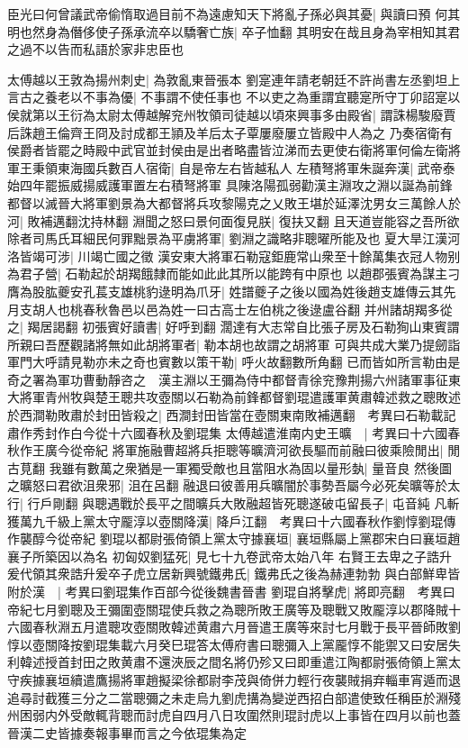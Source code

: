 臣光曰何曾議武帝偷惰取過目前不為遠慮知天下將亂子孫必與其憂|{
	與讀曰預}
何其明也然身為僭侈使子孫承流卒以驕奢亡族|{
	卒子恤翻}
其明安在哉且身為宰相知其君之過不以告而私語於家非忠臣也

太傅越以王敦為揚州刺史|{
	為敦亂東晉張本}
劉寔連年請老朝廷不許尚書左丞劉坦上言古之養老以不事為優|{
	不事謂不使任事也}
不以吏之為重謂宜聽寔所守丁卯詔寔以侯就第以王衍為太尉太傅越解兖州牧領司徒越以頃來興事多由殿省|{
	謂誅楊駿廢賈后誅趙王倫齊王冏及討成都王頴及羊后太子覃屢廢屢立皆殿中人為之}
乃奏宿衛有侯爵者皆罷之時殿中武官並封侯由是出者略盡皆泣涕而去更使右衛將軍何倫左衛將軍王秉領東海國兵數百人宿衛|{
	自是帝左右皆越私人}
左積弩將軍朱誕奔漢|{
	武帝泰始四年罷振威揚威護軍置左右積弩將軍}
具陳洛陽孤弱勸漢主淵攻之淵以誕為前鋒都督以滅晉大將軍劉景為大都督將兵攻黎陽克之乂敗王堪於延澤沈男女三萬餘人於河|{
	敗補邁翻沈持林翻}
淵聞之怒曰景何面復見朕|{
	復扶又翻}
且天道豈能容之吾所欲除者司馬氏耳細民何罪黜景為平虜將軍|{
	劉淵之識略非聰曜所能及也}
夏大旱江漢河洛皆竭可涉|{
	川竭亡國之徵}
漢安東大將軍石勒寇鉅鹿常山衆至十餘萬集衣冠人物别為君子營|{
	石勒起於胡羯餓隸而能如此此其所以能跨有中原也}
以趙郡張賓為謀主刁膺為股肱夔安孔萇支雄桃豹逯明為爪牙|{
	姓譜夔子之後以國為姓後趙支雄傳云其先月支胡人也桃春秋魯邑以邑為姓一曰古高士左伯桃之後逯盧谷翻}
并州諸胡羯多從之|{
	羯居謁翻}
初張賓好讀書|{
	好呼到翻}
濶達有大志常自比張子房及石勒狥山東賓謂所親曰吾歷觀諸將無如此胡將軍者|{
	勒本胡也故謂之胡將軍}
可與共成大業乃提劒詣軍門大呼請見勒亦未之奇也賓數以策干勒|{
	呼火故翻數所角翻}
已而皆如所言勒由是奇之署為軍功曹動靜咨之　漢主淵以王彌為侍中都督青徐兖豫荆揚六州諸軍事征東大將軍青州牧與楚王聰共攻壺關以石勒為前鋒都督劉琨遣護軍黄肅韓述救之聰敗述於西澗勒敗肅於封田皆殺之|{
	西澗封田皆當在壺關東南敗補邁翻　考異曰石勒載記肅作秀封作白今從十六國春秋及劉琨集}
太傅越遣淮南内史王曠　|{
	考異曰十六國春秋作王廣今從帝紀}
將軍施融曹超將兵拒聰等曠濟河欲長驅而前融曰彼乘險閒出|{
	閒古莧翻}
我雖有數萬之衆猶是一軍獨受敵也且當阻水為固以量形埶|{
	量音良}
然後圖之曠怒曰君欲沮衆邪|{
	沮在呂翻}
融退曰彼善用兵曠闇於事勢吾屬今必死矣曠等於太行|{
	行戶剛翻}
與聰遇戰於長平之間曠兵大敗融超皆死聰遂破屯留長子|{
	屯音純}
凡斬獲萬九千級上黨太守龎淳以壺關降漢|{
	降戶江翻　考異曰十六國春秋作劉惇劉琨傳作襲醇今從帝紀}
劉琨以都尉張倚領上黨太守據襄垣|{
	襄垣縣屬上黨郡宋白曰襄垣趙襄子所築因以為名}
初匈奴劉猛死|{
	見七十九卷武帝太始八年}
右賢王去卑之子誥升爰代領其衆誥升爰卒子虎立居新興號鐵弗氏|{
	鐵弗氏之後為赫連勃勃}
與白部鮮卑皆附於漢　|{
	考異曰劉琨集作百部今從後魏書晉書}
劉琨自將擊虎|{
	將即亮翻　考異曰帝紀七月劉聰及王彌圍壺關琨使兵救之為聰所敗王廣等及聰戰又敗龎淳以郡降賊十六國春秋淵五月遣聰攻壺關敗韓述黄肅六月晉遣王廣等來討七月戰于長平晉師敗劉惇以壺關降按劉琨集載六月癸巳琨答太傅府書曰聰彌入上黨龎惇不能禦又曰安居失利韓述授首封田之敗黄肅不還浹辰之間名將仍殄又曰即重遣江陶都尉張倚領上黨太守疾據襄垣續遣鷹揚將軍趙擬梁徐都尉李茂與倚併力輕行夜襲賊捐弃輜車宵遁而退追尋討截獲三分之二當聰彌之未走烏九劉虎搆為變逆西招白部遣使致任稱臣於淵殘州困弱内外受敵輒背聰而討虎自四月八日攻圍然則琨討虎以上事皆在四月以前也蓋晉漢二史皆據奏報事畢而言之今依琨集為定}
